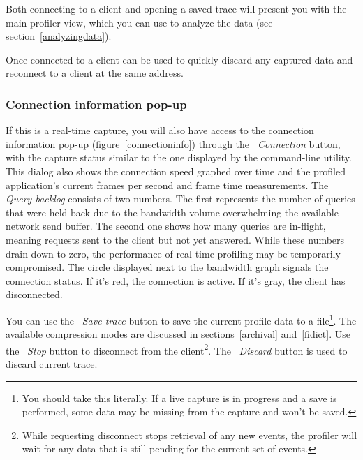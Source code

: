 \documentclass[hidelinks,titlepage,a4paper,twoside]{article}
\begin{document}
Both connecting to a client and opening a saved trace will present you with the main profiler view, which you can use to analyze the data (see section~\ref{analyzingdata}).

Once connected to a client  can be used to quickly discard any captured data and reconnect to a client at the same address.

\subsubsection{Connection information pop-up}
\label{connectionpopup}

If this is a real-time capture, you will also have access to the connection information pop-up (figure~\ref{connectioninfo}) through the \emph{\faWifi{}~Connection} button, with the capture status similar to the one displayed by the command-line utility. This dialog also shows the connection speed graphed over time and the profiled application's current frames per second and frame time measurements. The \emph{Query backlog} consists of two numbers. The first represents the number of queries that were held back due to the bandwidth volume overwhelming the available network send buffer. The second one shows how many queries are in-flight, meaning requests sent to the client but not yet answered. While these numbers drain down to zero, the performance of real time profiling may be temporarily compromised. The circle displayed next to the bandwidth graph signals the connection status. If it's red, the connection is active. If it's gray, the client has disconnected.

You can use the \faSave{}~\emph{Save trace} button to save the current profile data to a file\footnote{You should take this literally. If a live capture is in progress and a save is performed, some data may be missing from the capture and won't be saved.}. The available compression modes are discussed in sections~\ref{archival} and~\ref{fidict}. Use the \faPlug{}~\emph{Stop} button to disconnect from the client\footnote{While requesting disconnect stops retrieval of any new events, the profiler will wait for any data that is still pending for the current set of events.}. The \faExclamationTriangle{}~\emph{Discard} button is used to discard current trace.
\end{document}
